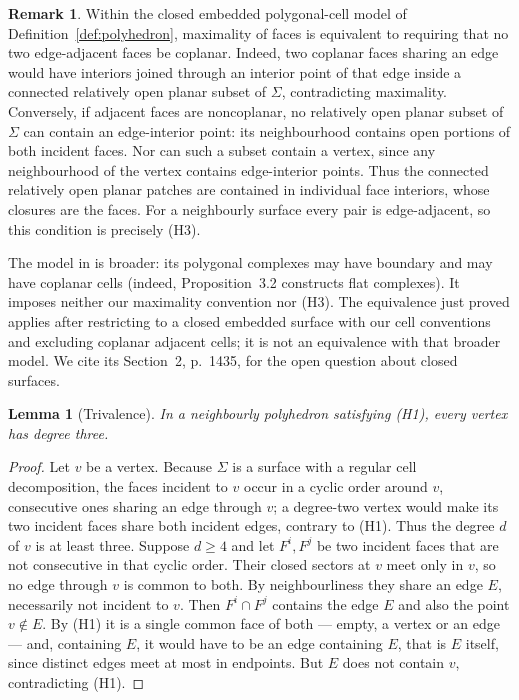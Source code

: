 \documentclass[11pt,reqno]{amsart}
\theoremstyle{plain}
\newtheorem{lemma}[theorem]{Lemma}
\theoremstyle{definition}
\newtheorem{remark}[theorem]{Remark}
\begin{document}
\begin{remark}
Within the closed embedded polygonal-cell model of Definition~\ref{def:polyhedron},
maximality of faces is equivalent to requiring that no two edge-adjacent faces be coplanar.
Indeed, two
coplanar faces sharing an edge would have interiors joined through an interior point of that edge
inside a connected relatively open planar subset of $\Sigma$, contradicting maximality.
Conversely, if adjacent faces are noncoplanar, no relatively open planar subset of $\Sigma$
can contain an edge-interior point: its neighbourhood contains open portions of both
incident faces. Nor can such a subset contain a vertex, since any neighbourhood of the
vertex contains edge-interior points. Thus the connected relatively open planar patches
are contained in individual face interiors, whose closures are the faces.
For a neighbourly surface every pair is edge-adjacent, so this condition is precisely (H3).

The model in \cite[Section~1, pp.~1430--1431]{ArsenevaEtAl2024} is broader: its polygonal
complexes may have boundary and may have coplanar cells (indeed, Proposition~3.2 constructs
flat complexes). It imposes neither our maximality convention nor (H3).
The equivalence just proved applies after restricting to a closed embedded surface with
our cell conventions and excluding coplanar adjacent cells; it is not an equivalence with
that broader model. We cite its Section~2, p.~1435, for the open question about closed surfaces.
\end{remark}

\begin{lemma}[Trivalence]\label{lem:trivalent}
In a neighbourly polyhedron satisfying \textup{(H1)}, every vertex has degree three.
\end{lemma}

\begin{proof}
Let $v$ be a vertex. Because $\Sigma$ is a surface with a regular cell decomposition, the faces
incident to $v$ occur in a cyclic order around $v$, consecutive ones sharing an edge through $v$;
a degree-two vertex would make its two incident faces share both incident edges, contrary to (H1).
Thus the degree $d$ of $v$ is at least three. Suppose $d\ge 4$ and let
$F^i,F^j$ be two incident faces that are not consecutive in that cyclic order. Their closed sectors at
$v$ meet only in $v$, so no edge through $v$ is common to both. By neighbourliness they share an edge
$E$, necessarily not incident to $v$. Then $F^i\cap F^j$ contains the edge $E$ and also the point
$v\notin E$. By (H1) it is a single common face of both --- empty, a vertex or an edge --- and,
containing $E$, it would have to be an edge containing $E$, that is $E$ itself, since distinct edges
meet at most in endpoints. But $E$ does not contain $v$, contradicting (H1).
\end{proof}
\end{document}
